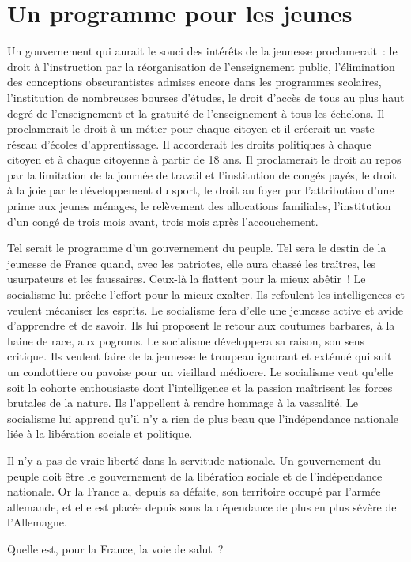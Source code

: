 \documentclass[french,twoside]{book} %
\newcommand\chapterclose{} %
\begin{document}
\section[{Un programme pour les jeunes}]{Un programme pour les jeunes}
\noindent Un gouvernement qui aurait le souci des intérêts de la jeunesse proclamerait : le droit à l’instruction par la réorganisation de l’enseignement public, l’élimination des conceptions obscurantistes admises encore dans les programmes scolaires, l’institution de nombreuses bourses d’études, le droit d’accès de tous au plus haut degré de l’enseignement et la gratuité de l’enseignement à tous les échelons. Il proclamerait le droit à un métier pour chaque citoyen et il créerait un vaste réseau d’écoles d’apprentissage. Il accorderait les droits politiques à chaque citoyen et à chaque citoyenne à partir de 18 ans. Il proclamerait le droit au repos par la limitation de la journée de travail et l’institution de congés payés, le droit à la joie par le développement du sport, le droit au foyer par l’attribution d’une prime aux jeunes ménages, le relèvement des allocations familiales, l’institution d’un congé de trois mois avant, trois mois après l’accouchement.\par
Tel serait le programme d’un gouvernement du peuple. Tel sera le destin de la jeunesse de France quand, avec les patriotes, elle aura chassé les traîtres, les usurpateurs et les faussaires. Ceux-là la flattent pour la mieux abêtir ! Le socialisme lui prêche l’effort pour la mieux exalter. Ils refoulent les intelligences et veulent mécaniser les esprits. Le socialisme fera d’elle une jeunesse active et avide d’apprendre et de savoir. Ils lui proposent le retour aux coutumes barbares, à la haine de race, aux pogroms. Le socialisme développera sa raison, son sens critique. Ils veulent faire de la jeunesse le troupeau ignorant et exténué qui suit un condottiere ou pavoise pour un vieillard médiocre. Le socialisme veut qu’elle soit la cohorte enthousiaste dont l’intelligence et la passion maîtrisent les forces brutales de la nature. Ils l’appellent à rendre hommage à la vassalité. Le socialisme lui apprend qu’il n’y a rien de plus beau que l’indépendance nationale liée à la libération sociale et politique.\par
Il n’y a pas de vraie liberté dans la servitude nationale. Un gouvernement du peuple doit être le gouvernement de la libération sociale et de l’indépendance nationale. Or la France a, depuis sa défaite, son territoire occupé par l’armée allemande, et elle est placée depuis sous la dépendance de plus en plus sévère de l’Allemagne.\par
Quelle est, pour la France, la voie de salut ?
\chapterclose
\end{document}
